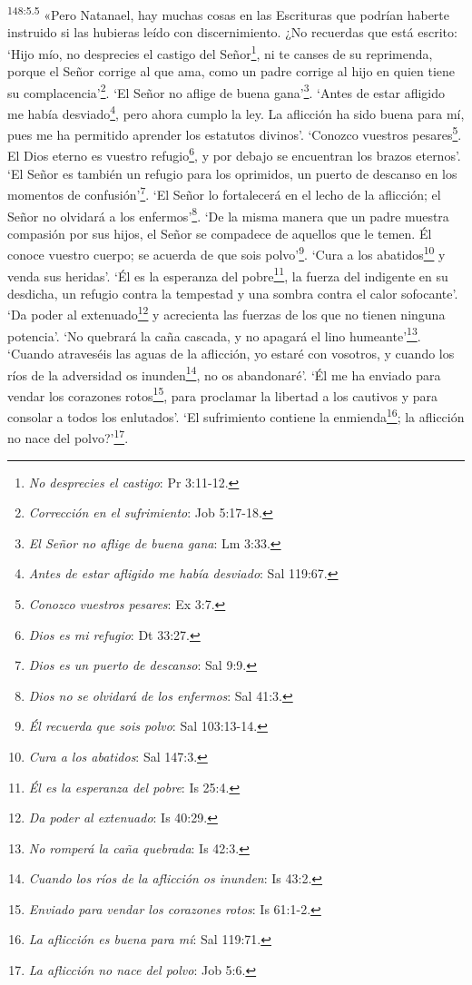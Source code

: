 \par
\textsuperscript{148:5.5} «Pero Natanael, hay muchas cosas en las Escrituras que podrían haberte instruido si las hubieras leído con discernimiento. ¿No recuerdas que está escrito: `Hijo mío, no desprecies el castigo del Señor\footnote{\textit{No desprecies el castigo}: Pr 3:11-12.}, ni te canses de su reprimenda, porque el Señor corrige al que ama, como un padre corrige al hijo en quien tiene su complacencia'\footnote{\textit{Corrección en el sufrimiento}: Job 5:17-18.}. `El Señor no aflige de buena gana'\footnote{\textit{El Señor no aflige de buena gana}: Lm 3:33.}. `Antes de estar afligido me había desviado\footnote{\textit{Antes de estar afligido me había desviado}: Sal 119:67.}, pero ahora cumplo la ley. La aflicción ha sido buena para mí, pues me ha permitido aprender los estatutos divinos'. `Conozco vuestros pesares\footnote{\textit{Conozco vuestros pesares}: Ex 3:7.}. El Dios eterno es vuestro refugio\footnote{\textit{Dios es mi refugio}: Dt 33:27.}, y por debajo se encuentran los brazos eternos'. `El Señor es también un refugio para los oprimidos, un puerto de descanso en los momentos de confusión'\footnote{\textit{Dios es un puerto de descanso}: Sal 9:9.}. `El Señor lo fortalecerá en el lecho de la aflicción; el Señor no olvidará a los enfermos'\footnote{\textit{Dios no se olvidará de los enfermos}: Sal 41:3.}. `De la misma manera que un padre muestra compasión por sus hijos, el Señor se compadece de aquellos que le temen. Él conoce vuestro cuerpo; se acuerda de que sois polvo'\footnote{\textit{Él recuerda que sois polvo}: Sal 103:13-14.}. `Cura a los abatidos\footnote{\textit{Cura a los abatidos}: Sal 147:3.} y venda sus heridas'. `Él es la esperanza del pobre\footnote{\textit{Él es la esperanza del pobre}: Is 25:4.}, la fuerza del indigente en su desdicha, un refugio contra la tempestad y una sombra contra el calor sofocante'. `Da poder al extenuado\footnote{\textit{Da poder al extenuado}: Is 40:29.} y acrecienta las fuerzas de los que no tienen ninguna potencia'. `No quebrará la caña cascada, y no apagará el lino humeante'\footnote{\textit{No romperá la caña quebrada}: Is 42:3.}. `Cuando atraveséis las aguas de la aflicción, yo estaré con vosotros, y cuando los ríos de la adversidad os inunden\footnote{\textit{Cuando los ríos de la aflicción os inunden}: Is 43:2.}, no os abandonaré'. `Él me ha enviado para vendar los corazones rotos\footnote{\textit{Enviado para vendar los corazones rotos}: Is 61:1-2.}, para proclamar la libertad a los cautivos y para consolar a todos los enlutados'. `El sufrimiento contiene la enmienda\footnote{\textit{La aflicción es buena para mí}: Sal 119:71.}; la aflicción no nace del polvo?'\footnote{\textit{La aflicción no nace del polvo}: Job 5:6.}.

